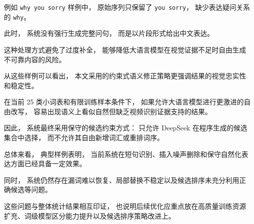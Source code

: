 例如 \texttt{why you sorry} 样例中，
原始序列只保留了 \texttt{you sorry}，
缺少表达疑问关系的 \texttt{why}。

此时，
系统没有强行生成完整问句，
而是以片段形式给出中文表达。

这种处理方式避免了过度补全，
能够降低大语言模型在视觉证据不足时自由生成不可靠内容的风险。

从这些样例可以看出，
本文采用的约束式语义修正策略更强调结果的视觉忠实性和稳定性。

在当前 25 类小词表和有限训练样本条件下，
如果允许大语言模型进行更激进的自由改写，
容易出现语义上看似自然但缺乏视频识别证据支持的结果。

因此，
系统最终采用保守的候选约束方式：
只允许 DeepSeek 在程序生成的候选集合中选择，
而不允许其自由新增词汇或重排词序。

总体来看，
典型样例表明，
当前系统在短句识别、插入噪声删除和保守自然化表达方面已经具备一定效果。

同时，
系统仍然存在漏词难以恢复、局部替换不稳定以及候选排序未充分利用正确候选等问题。

这些问题与整体统计结果相互印证，
也说明后续优化应重点放在高质量训练资源扩充、词级模型区分能力提升以及候选排序策略改进上。